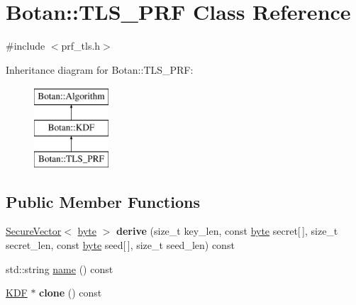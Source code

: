 \hypertarget{classBotan_1_1TLS__PRF}{\section{Botan\-:\-:T\-L\-S\-\_\-\-P\-R\-F Class Reference}
\label{classBotan_1_1TLS__PRF}
}


{\ttfamily \#include $<$prf\-\_\-tls.\-h$>$}

Inheritance diagram for Botan\-:\-:T\-L\-S\-\_\-\-P\-R\-F\-:\begin{figure}[H]
\begin{center}
\leavevmode
\includegraphics[height=3.000000cm]{classBotan_1_1TLS__PRF}
\end{center}
\end{figure}
\subsection*{Public Member Functions}
\begin{DoxyCompactItemize}
\item 
\hypertarget{classBotan_1_1TLS__PRF_a8d13483ef92d76605a4268df69ea586a}{\hyperlink{classBotan_1_1SecureVector}{Secure\-Vector}$<$ \hyperlink{namespaceBotan_a7d793989d801281df48c6b19616b8b84}{byte} $>$ {\bfseries derive} (size\-\_\-t key\-\_\-len, const \hyperlink{namespaceBotan_a7d793989d801281df48c6b19616b8b84}{byte} secret\mbox{[}$\,$\mbox{]}, size\-\_\-t secret\-\_\-len, const \hyperlink{namespaceBotan_a7d793989d801281df48c6b19616b8b84}{byte} seed\mbox{[}$\,$\mbox{]}, size\-\_\-t seed\-\_\-len) const }\label{classBotan_1_1TLS__PRF_a8d13483ef92d76605a4268df69ea586a}

\item 
std\-::string \hyperlink{classBotan_1_1TLS__PRF_a7d32bbcf1ee24347b6d366f0f6393475}{name} () const 
\item 
\hypertarget{classBotan_1_1TLS__PRF_ae9f12a6c62e6d70badf61bc930895b3a}{\hyperlink{classBotan_1_1KDF}{K\-D\-F} $\ast$ {\bfseries clone} () const }\label{classBotan_1_1TLS__PRF_ae9f12a6c62e6d70badf61bc930895b3a}

\end{DoxyCompactItemize}


